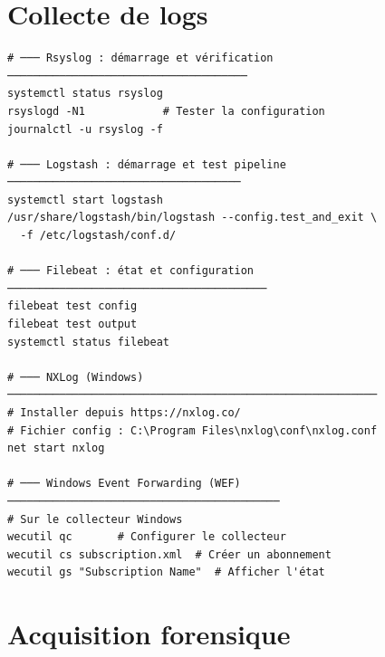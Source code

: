\section{Collecte de logs}
\label{ann:tools-logs}

\begin{lstlisting}[style=StyleTerminal,
  caption={Commandes essentielles: collecte de logs},
  label={lst:tools-logs}]
# ─── Rsyslog : démarrage et vérification ─────────────────────────────────────
systemctl status rsyslog
rsyslogd -N1            # Tester la configuration
journalctl -u rsyslog -f

# ─── Logstash : démarrage et test pipeline ────────────────────────────────────
systemctl start logstash
/usr/share/logstash/bin/logstash --config.test_and_exit \
  -f /etc/logstash/conf.d/

# ─── Filebeat : état et configuration ────────────────────────────────────────
filebeat test config
filebeat test output
systemctl status filebeat

# ─── NXLog (Windows) ─────────────────────────────────────────────────────────
# Installer depuis https://nxlog.co/
# Fichier config : C:\Program Files\nxlog\conf\nxlog.conf
net start nxlog

# ─── Windows Event Forwarding (WEF) ──────────────────────────────────────────
# Sur le collecteur Windows
wecutil qc       # Configurer le collecteur
wecutil cs subscription.xml  # Créer un abonnement
wecutil gs "Subscription Name"  # Afficher l'état
\end{lstlisting}

\section{Acquisition forensique}
\label{ann:tools-acq}


